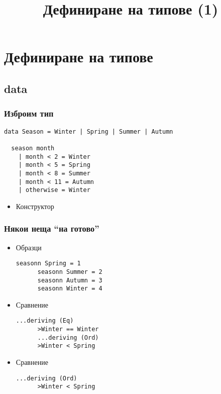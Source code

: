 \documentclass{beamer}
\begin{document}
\title[Типове]{Дефиниране на типове (1)}
\frame{\titlepage}

\section{Дефиниране на типове}
\subsection{data}


\begin{frame}[fragile]
  \frametitle{Изброим тип}

\begin{lstlisting}[basicstyle=\small]
  data Season = Winter | Spring | Summer | Autumn

  season month
    | month < 2 = Winter
    | month < 5 = Spring
    | month < 8 = Summer
    | month < 11 = Autumn
    | otherwise = Winter
\end{lstlisting}

\begin{itemize}
  \item Конструктор
\end{itemize}

\end{frame}

\begin{frame}[fragile]
  \frametitle{Някои неща ``на готово''}

\begin{itemize}
  \item Образци
  \begin{lstlisting}[basicstyle=\small]
      seasonn Spring = 1
      seasonn Summer = 2
      seasonn Autumn = 3
      seasonn Winter = 4
  \end{lstlisting}
  \item Сравнение
  \begin{lstlisting}[basicstyle=\small]
      ...deriving (Eq)
      >Winter == Winter
      ...deriving (Ord)
      >Winter < Spring
  \end{lstlisting}
  \item Сравнение
  \begin{lstlisting}[basicstyle=\small]
      ...deriving (Ord)
      >Winter < Spring
  \end{lstlisting}
\end{itemize}

\end{frame}
\end{document}
